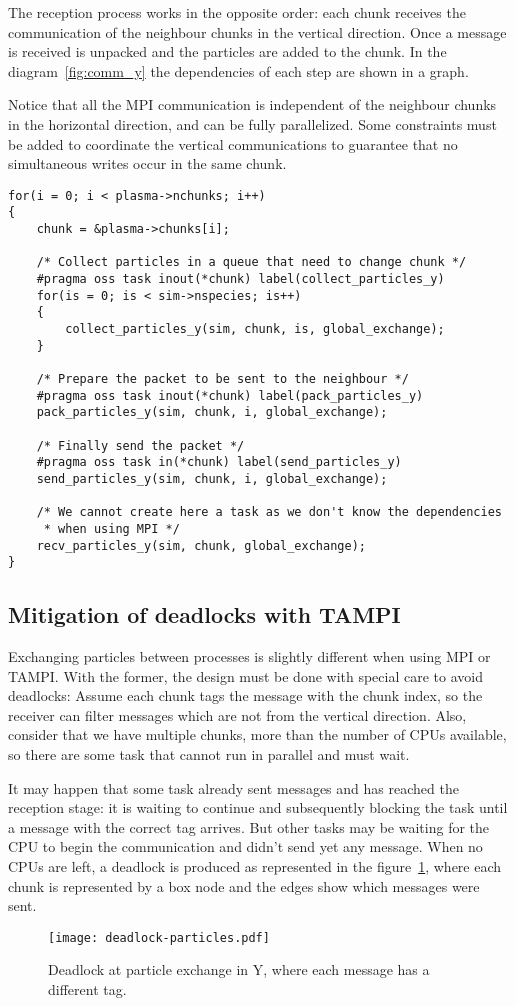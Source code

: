 The reception process works in the opposite order: each chunk receives the 
communication of the neighbour chunks in the vertical direction. Once a message 
is received is unpacked and the particles are added to the chunk. In the 
diagram~\ref{fig:comm_y} the dependencies of each step are shown in a graph.

Notice that all the MPI communication is independent of the neighbour chunks in 
the horizontal direction, and can be fully parallelized. Some constraints must 
be added to coordinate the vertical communications to guarantee that no 
simultaneous writes occur in the same chunk.

\begin{lstlisting}
for(i = 0; i < plasma->nchunks; i++)
{
	chunk = &plasma->chunks[i];

	/* Collect particles in a queue that need to change chunk */
	#pragma oss task inout(*chunk) label(collect_particles_y)
	for(is = 0; is < sim->nspecies; is++)
	{
		collect_particles_y(sim, chunk, is, global_exchange);
	}

	/* Prepare the packet to be sent to the neighbour */
	#pragma oss task inout(*chunk) label(pack_particles_y)
	pack_particles_y(sim, chunk, i, global_exchange);

	/* Finally send the packet */
	#pragma oss task in(*chunk) label(send_particles_y)
	send_particles_y(sim, chunk, i, global_exchange);

	/* We cannot create here a task as we don't know the dependencies
	 * when using MPI */
	recv_particles_y(sim, chunk, global_exchange);
}
\end{lstlisting}

\subsection{Mitigation of deadlocks with TAMPI}

Exchanging particles between processes is slightly different when using MPI or 
TAMPI. With the former, the design must be done with special care to avoid 
deadlocks: Assume each chunk tags the message with the chunk index, so the 
receiver can filter messages which are not from the vertical direction. Also, 
consider that we have multiple chunks, more than the number of CPUs available, 
so there are some task that cannot run in parallel and must wait.

It may happen that some task already sent messages and has reached the reception 
stage: it is waiting to continue and subsequently blocking the task until a 
message with the correct tag arrives. But other tasks may be waiting for the CPU 
to begin the communication and didn't send yet any message. When no CPUs are 
left, a deadlock is produced as represented in the 
figure~\ref{fig:comm_deadlock}, where each chunk is represented by a box node 
and the edges show which messages were sent.
%
\begin{figure}
\centering
\texttt{[image: deadlock-particles.pdf]}
\caption{Deadlock at particle exchange in Y, where each message has a different 
tag.}
\label{fig:comm_deadlock}
\end{figure}

